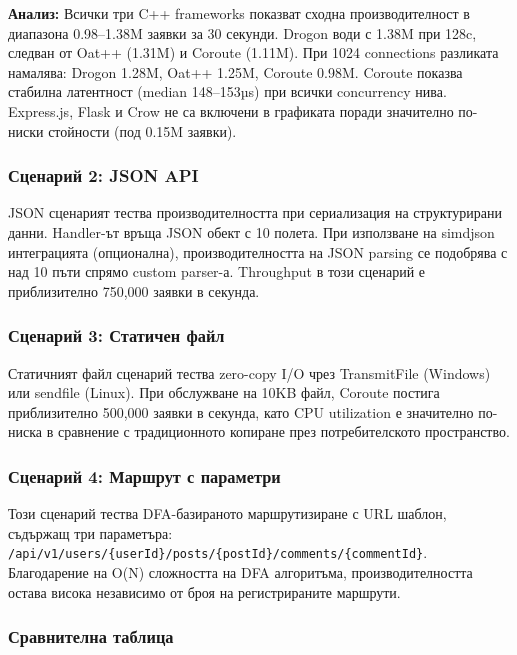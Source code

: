 \textbf{Анализ:} Всички три C++ frameworks показват сходна производителност в диапазона 0.98--1.38M заявки за 30 секунди. Drogon води с 1.38M при 128c, следван от Oat++ (1.31M) и Coroute (1.11M). При 1024 connections разликата намалява: Drogon 1.28M, Oat++ 1.25M, Coroute 0.98M. Coroute показва стабилна латентност (median 148--153µs) при всички concurrency нива. Express.js, Flask и Crow не са включени в графиката поради значително по-ниски стойности (под 0.15M заявки).

\subsubsection{Сценарий 2: JSON API}

JSON сценарият тества производителността при сериализация на структурирани данни. Handler-ът връща JSON обект с 10 полета. При използване на simdjson интеграцията (опционална), производителността на JSON parsing се подобрява с над 10 пъти спрямо custom parser-а. Throughput в този сценарий е приблизително 750,000 заявки в секунда.

\subsubsection{Сценарий 3: Статичен файл}

Статичният файл сценарий тества zero-copy I/O чрез TransmitFile (Windows) или sendfile (Linux). При обслужване на 10KB файл, Coroute постига приблизително 500,000 заявки в секунда, като CPU utilization е значително по-ниска в сравнение с традиционното копиране през потребителското пространство.

\subsubsection{Сценарий 4: Маршрут с параметри}

Този сценарий тества DFA-базираното маршрутизиране с URL шаблон, съдържащ три параметъра: \texttt{/api/v1/users/\{userId\}/posts/\{postId\}/comments/\{commentId\}}. Благодарение на O(N) сложността на DFA алгоритъма, производителността остава висока независимо от броя на регистрираните маршрути.

\subsubsection{Сравнителна таблица}

